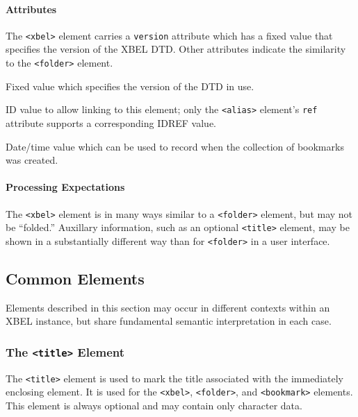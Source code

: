 \documentclass{howto}
\newcommand{\element}[1]{\texttt{<#1>}}
\newcommand{\attribute}[1]{\texttt{#1}}
\begin{document}
      \paragraph*{Attributes}
        The \element{xbel} element carries a \attribute{version}
        attribute which has a fixed value that specifies the version
        of the XBEL DTD.  Other attributes indicate the similarity to
        the \element{folder} element.

        \begin{definitions}
          \term{\attribute{version}, \emph{fixed}}
          Fixed value which specifies the version of the DTD in use.

          \term{\attribute{id}}
          ID value to allow linking to this element; only the
          \element{alias} element's \attribute{ref} attribute supports
          a corresponding IDREF value.

          \term{\attribute{added}}
          Date/time value which can be used to record when the
          collection of bookmarks was created.
	\end{definitions}

      \paragraph*{Processing Expectations}
        The \element{xbel} element is in many ways similar to a
        \element{folder} element, but may not be ``folded.''
        Auxillary information, such as an optional \element{title}
        element, may be shown in a substantially different way than
        for \element{folder} in a user interface.

  \subsection{Common Elements
              \label{common-elements}}

    Elements described in this section may occur in different contexts
    within an XBEL instance, but share fundamental semantic
    interpretation in each case.

    \subsubsection{The \element{title} Element
                   \label{element-title}}

      The \element{title} element is used to mark the title associated
      with the immediately enclosing element.  It is used for
      the \element{xbel}, \element{folder}, and \element{bookmark}
      elements.  This element is always optional and may contain
      only character data.
\end{document}
